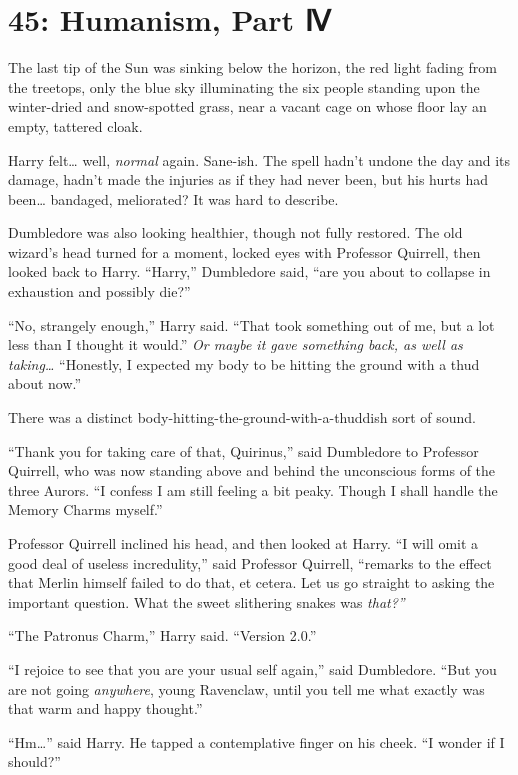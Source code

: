 \chapter{45: Humanism, Part Ⅳ}

The last tip of the Sun was sinking below the horizon, the red light
fading from the treetops, only the blue sky illuminating the six people
standing upon the winter-dried and snow-spotted grass, near a vacant
cage on whose floor lay an empty, tattered cloak.

Harry felt\ldots{} well, \emph{normal} again. Sane-ish. The spell hadn't
undone the day and its damage, hadn't made the injuries as if they had
never been, but his hurts had been\ldots{} bandaged, meliorated? It was
hard to describe.

Dumbledore was also looking healthier, though not fully restored. The
old wizard's head turned for a moment, locked eyes with Professor
Quirrell, then looked back to Harry. ``Harry,'' Dumbledore said, ``are
you about to collapse in exhaustion and possibly die?''

``No, strangely enough,'' Harry said. ``That took something out of me,
but a lot less than I thought it would.'' \emph{Or maybe it gave
something back, as well as taking\ldots{}} ``Honestly, I expected my
body to be hitting the ground with a thud about now.''

There was a distinct body-hitting-the-ground-with-a-thuddish sort of
sound.

``Thank you for taking care of that, Quirinus,'' said Dumbledore to
Professor Quirrell, who was now standing above and behind the
unconscious forms of the three Aurors. ``I confess I am still feeling a
bit peaky. Though I shall handle the Memory Charms myself.''

Professor Quirrell inclined his head, and then looked at Harry. ``I will
omit a good deal of useless incredulity,'' said Professor Quirrell,
``remarks to the effect that Merlin himself failed to do that, et
cetera. Let us go straight to asking the important question. What the
sweet slithering snakes was \emph{that?''}

``The Patronus Charm,'' Harry said. ``Version 2.0.''

``I rejoice to see that you are your usual self again,'' said
Dumbledore. ``But you are not going \emph{anywhere}, young Ravenclaw,
until you tell me what exactly was that warm and happy thought.''

``Hm\ldots{}'' said Harry. He tapped a contemplative finger on his
cheek. ``I wonder if I should?''

